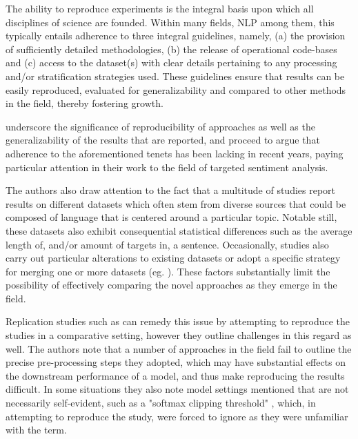 \documentclass[../../fyp.tex]{subfiles}
\begin{document}
The ability to reproduce experiments is the integral basis upon which all disciplines of science are founded. Within many fields, NLP among them, this typically entails adherence to three integral guidelines, namely, (a) the provision of sufficiently detailed methodologies, (b) the release of operational code-bases and (c) access to the dataset(s) with clear details pertaining to any processing and/or stratification strategies used. These guidelines ensure that results can be easily reproduced, evaluated for generalizability and compared to other methods in the field, thereby fostering growth.

\citet{moore2018} underscore the significance of reproducibility of approaches as well as the generalizability of the results that are reported, and proceed to argue that adherence to the aforementioned tenets has been lacking in recent years, paying particular attention in their work to the field of targeted sentiment analysis.

The authors also draw attention to the fact that a multitude of studies report results on different datasets which often stem from diverse sources that could be composed of language that is centered around a particular topic. Notable still, these datasets also exhibit consequential statistical differences such as the average length of, and/or amount of targets in, a sentence. Occasionally, studies also carry out particular alterations to existing datasets or adopt a specific strategy for merging one or more datasets (eg. \cite{xue2018}). These factors substantially limit the possibility of effectively comparing the novel approaches as they emerge in the field.

Replication studies such as \cite{moore2018} can remedy this issue by attempting to reproduce the studies in a comparative setting, however they outline challenges in this regard as well. The authors note that a number of approaches in the field fail to outline the precise pre-processing steps they adopted, which may have substantial effects on the downstream performance of a model, and thus make reproducing the results difficult. In some situations they also note model settings mentioned that are not necessarily self-evident, such as a "softmax clipping threshold" \cite{tang2016b}, which, in attempting to reproduce the study, \citet{moore2018} were forced to ignore as they were unfamiliar with the term.
\end{document}
